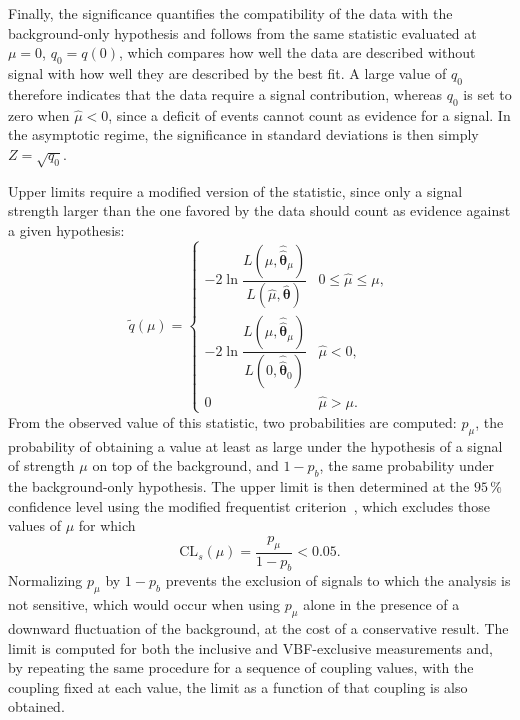 Finally, the significance quantifies the compatibility of the data with the background-only hypothesis and follows from the same statistic evaluated at $\mu = 0$, $q_0 = q(0)$, which compares how well the data are described without signal with how well they are described by the best fit. A large value of $q_0$ therefore indicates that the data require a signal contribution, whereas $q_0$ is set to zero when $\hat{\mu} < 0$, since a deficit of events cannot count as evidence for a signal. In the asymptotic regime, the significance in standard deviations is then simply $Z = \sqrt{q_0}$.\medskip

Upper limits require a modified version of the statistic, since only a signal strength larger than the one favored by the data should count as evidence against a given hypothesis:
\begin{equation}
    \tilde{q}(\mu) =
    \begin{cases}
        -2\ln\dfrac{L(\mu,\hat{\hat{\boldsymbol{\theta}}}_\mu)}{L(\hat{\mu},\hat{\boldsymbol{\theta}})} & 0 \leq \hat{\mu} \leq \mu, \\[2ex]
        -2\ln\dfrac{L(\mu,\hat{\hat{\boldsymbol{\theta}}}_\mu)}{L(0,\hat{\hat{\boldsymbol{\theta}}}_0)} & \hat{\mu} < 0, \\[2ex]
        0 & \hat{\mu} > \mu.
    \end{cases}
    \label{eq:test_statistic_limits}
\end{equation}
From the observed value of this statistic, two probabilities are computed: $p_\mu$, the probability of obtaining a value at least as large under the hypothesis of a signal of strength $\mu$ on top of the background, and $1-p_b$, the same probability under the background-only hypothesis. The upper limit is then determined at the $95\,\%$ confidence level using the modified frequentist criterion~\cite{Junk:1999kv,Read:2002hq,ATLAS:2011tau}, which excludes those values of $\mu$ for which
\begin{equation}
    \text{CL}_s(\mu) = \frac{p_\mu}{1-p_b} < 0.05 .
    \label{eq:cls}
\end{equation}
Normalizing $p_\mu$ by $1-p_b$ prevents the exclusion of signals to which the analysis is not sensitive, which would occur when using $p_\mu$ alone in the presence of a downward fluctuation of the background, at the cost of a conservative result. The limit is computed for both the inclusive and VBF-exclusive measurements and, by repeating the same procedure for a sequence of coupling values, with the coupling fixed at each value, the limit as a function of that coupling is also obtained.\medskip

